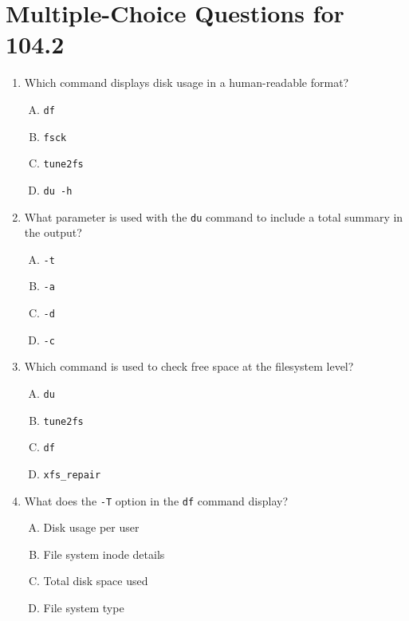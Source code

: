 \documentclass[a4paper]{report}
\begin{document}
\section*{Multiple-Choice Questions for 104.2}
\begin{enumerate}[1.]

    \item Which command displays disk usage in a human-readable format?  
    \begin{enumerate}[A)]
        \item \texttt{df}  
        \item \texttt{fsck}  
        \item \texttt{tune2fs}  
        \item \texttt{du -h}  
    \end{enumerate}

    \item What parameter is used with the \texttt{du} command to include a total summary in the output?  
    \begin{enumerate}[A)]
        \item \texttt{-t}  
        \item \texttt{-a}  
        \item \texttt{-d}  
        \item \texttt{-c}  
    \end{enumerate}

    \item Which command is used to check free space at the filesystem level?  
    \begin{enumerate}[A)]
        \item \texttt{du}  
        \item \texttt{tune2fs}  
        \item \texttt{df}  
        \item \texttt{xfs\_repair}  
    \end{enumerate}

    \item What does the \texttt{-T} option in the \texttt{df} command display?  
    \begin{enumerate}[A)]
        \item Disk usage per user  
        \item File system inode details  
        \item Total disk space used  
        \item File system type  
    \end{enumerate}


\end{enumerate}
\end{document}
